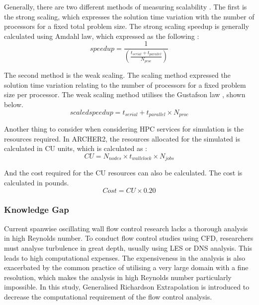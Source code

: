 Generally, there are two different methods of measuring scalability \cite{Li2018}. The first is the strong scaling, which expresses the solution time variation with the number of processors for a fixed total problem size. The strong scaling speedup is generally calculated using Amdahl law, which expressed as the following \cite{Amdahl1967}:
\begin{equation}
	speedup = \frac{1} {\left(\frac{t_{serial}+t_{parallel}}{N_{proc}}\right)}
\end{equation}

The second method is the weak scaling. The scaling method expressed the solution time variation relating to the number of processors for a fixed problem size per processor. The weak scaling method utilises the Gustafson law \cite{Gustafson1988}, shown below.
\begin{equation}
	scaled speedup = t_{serial} + t_{parallel} \times N_{proc}
\end{equation}

Another thing to consider when considering HPC services for simulation is the resources required. In ARCHER2, the resources allocated for the simulated is calculated in CU units, which is calculated as \cite{EPCC2024}:
\begin{equation}
	CU = N_{nodes} \times t_{wallclock} \times N_{jobs}
\end{equation}

And the cost required for the CU resources can also be calculated. The cost is calculated in pounds.
\begin{equation}
	Cost = CU \times 0.20
\end{equation}



\subsubsection{Knowledge Gap}
\label{sec:litrev_knowgap}
Current spanwise oscillating wall flow control research lacks a thorough analysis in high Reynolds number. To conduct flow control studies using CFD, researchers must analyse turbulence in great depth, usually using LES or DNS analysis. This leads to high computational expenses. The expensiveness in the analysis is also exacerbated by the common practice of utilising a very large domain with a fine resolution, which makes the analysis in high Reynolds number particularly impossible. In this study, Generalised Richardson Extrapolation is introduced to decrease the computational requirement of the flow control analysis.

